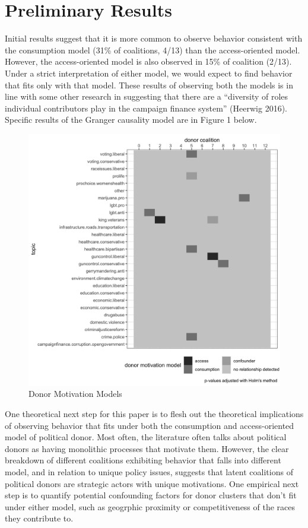 \documentclass[12pt,]{article}
\begin{document}
\hypertarget{preliminary-results}{%
\section{Preliminary Results}\label{preliminary-results}}

Initial results suggest that it is more common to observe behavior
consistent with the consumption model (31\% of coalitions, 4/13) than
the access-oriented model. However, the access-oriented model is also
observed in 15\% of coalition (2/13). Under a strict interpretation of
either model, we would expect to find behavior that fits only with that
model. These results of observing both the models is in line with some
other research in suggesting that there are a ``diversity of roles
individual contributors play in the campaign finance system'' (Heerwig
2016). Specific results of the Granger causality model are in Figure 1
below.

\begin{figure}
\centering
\includegraphics{../tables_and_figures/aejmc_abstract_1.jpg}
\caption{Donor Motivation Models}
\end{figure}

One theoretical next step for this paper is to flesh out the theoretical
implications of observing behavior that fits under both the consumption
and access-oriented model of political donor. Most often, the literature
often talks about political donors as having monolithic processes that
motivate them. However, the clear breakdown of different coalitions
exhibiting behavior that falls into different model, and in relation to
unique policy issues, suggests that latent coalitions of political
donors are strategic actors with unique motivations. One empirical next
step is to quantify potential confounding factors for donor clusters
that don't fit under either model, such as geogrphic proximity or
competitiveness of the races they contribute to.
\end{document}

